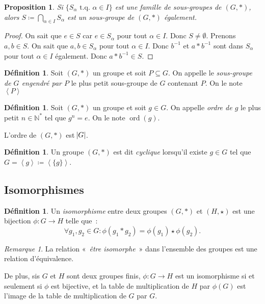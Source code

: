 \documentclass{article}
\newtheorem{prp}[thm]{Proposition}
\theoremstyle{definition}
\newtheorem{déf}[thm]{Définition}
\theoremstyle{remark}
\newtheorem*{rmq}{Remarque}
\DeclareMathOperator{\ord}{ord}
\newcommand{\N}{\mathbb N}
\newcommand{\tq}{\text{ t.q. }}
\newcommand{\eng}[1]{\left\langle#1\right\rangle}
\begin{document}
		\begin{prp}\label{prp:intersection_sous-groupes} Si $\{S_\alpha \tq \alpha \in I\}$ est une famille de sous-groupes de $(G, *)$, alors
		$S \coloneqq \bigcap_{\alpha \in I}S_\alpha$ est un sous-groupe de $(G, *)$ également.
		\end{prp}

		\begin{proof} On sait que $e \in S$ car $e \in S_\alpha$ pour tout $\alpha \in I$. Donc $S \neq \emptyset$. Prenons $a, b \in S$. On sait que
		$a, b \in S_\alpha$ pour tout $\alpha \in I$. Donc $b^{-1}$ et $a*b^{-1}$ sont dans $S_\alpha$ pour tout $\alpha \in I$ également. Donc $a*b^{-1} \in S$.
		\end{proof}

		\begin{déf} Soit $(G, *)$ un groupe et soit $P \subseteq G$. On appelle le \textit{sous-groupe de $G$ engendré par $P$} le plus petit sous-groupe de $G$
		contenant $P$. On le note $\eng P$
		\end{déf}

		\begin{déf} Soit $(G, *)$ un groupe et soit $g \in G$. On appelle \textit{ordre de $g$} le plus petit $n \in \N^*$ tel que $g^n = e$.
		On le note $\ord(g)$.

		L'ordre de $(G, *)$ est $\abs G$.
		\end{déf}

		\begin{déf} Un groupe $(G, *)$ est dit \textit{cyclique} lorsqu'il existe $g \in G$ tel que $G = \eng g \coloneqq \eng {\{g\}}$.
		\end{déf}

	\subsection{Isomorphismes}
		\begin{déf} Un \textit{isomorphisme} entre deux groupes $(G, *)$ et $(H, \star)$ est une bijection $\phi : G \to H$ telle que~:
		\[\forall g_1, g_2 \in G : \phi(g_1 * g_2) = \phi(g_1) \star \phi(g_2).\]
		\end{déf}

		\begin{rmq} La relation «~\textit{être isomorphe}~» dans l'ensemble des groupes est une relation d'équivalence.

		De plus, sis $G$ et $H$ sont deux groupes finis, $\phi : G \to H$ est un isomorphisme si et seulement si $\phi$ est bijective, et la table de
		multiplication de $H$ par $\phi(G)$ est l'image de la table de multiplication de $G$ par $G$.
		\end{rmq}
\end{document}
